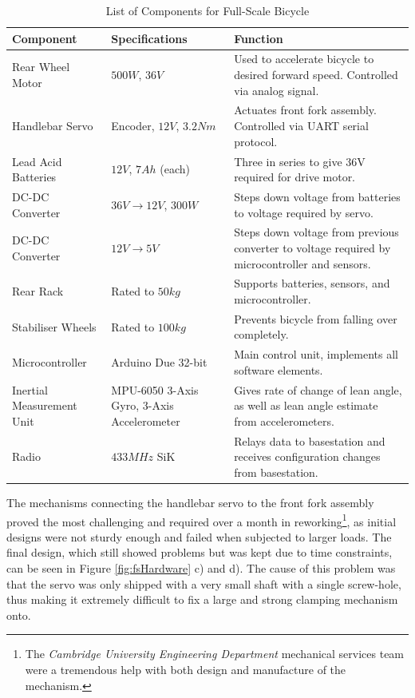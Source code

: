 \vfill
\begin{table}[H]
	\centering
 	\begin{tabular}[t]{p{4cm} p{4cm} p{7cm}} 
	\toprule
	Component & Specifications & Function \\
 	\midrule
 	Rear Wheel Motor & $\si{500W}$, $\si{36V}$ & Used to accelerate bicycle to desired forward speed. Controlled via analog signal. \\ 
 	Handlebar Servo & Encoder, $\si{12V}$, $3.2\si{Nm}$ & Actuates front fork assembly. Controlled via UART serial protocol. \\
 	Lead Acid Batteries & $\si{12V}$, $\si{7Ah}$ (each) & Three in series to give 36V required for drive motor. \\
 	DC-DC Converter & $\si{36V} \rightarrow \si{12V}$, $\si{300W}$ & Steps down voltage from batteries to voltage required by servo. \\
 	DC-DC Converter & $\si{12V} \rightarrow \si{5V}$ & Steps down voltage from previous converter to voltage required by microcontroller and sensors. \\
 	Rear Rack & Rated to $\si{50kg}$ & Supports batteries, sensors, and microcontroller. \\
 	Stabiliser Wheels & Rated to $\si{100kg}$ & Prevents bicycle from falling over completely. \\
 	Microcontroller & Arduino Due 32-bit & Main control unit, implements all software elements. \\
 	Inertial Measurement Unit & MPU-6050 3-Axis Gyro, 3-Axis Accelerometer & Gives rate of change of lean angle, as well as lean angle estimate from accelerometers. \\
 	Radio & $433\si{MHz}$ SiK & Relays data to basestation and receives configuration changes from basestation. \\
 	\bottomrule
	\end{tabular}
 	\caption{List of Components for Full-Scale Bicycle}
	\label{table:fscomponents}
\end{table}
\vfill

\newpage
The mechanisms connecting the handlebar servo to the front fork assembly proved the most challenging and required over a month in reworking\footnote{The \textit{Cambridge University Engineering Department} mechanical services team were a tremendous help with both design and manufacture of the mechanism.}, as initial designs were not sturdy enough and failed when subjected to larger loads. The final design, which still showed problems but was kept due to time constraints, can be seen in Figure \ref{fig:fsHardware} c) and d). The cause of this problem was that the servo was only shipped with a very small shaft with a single screw-hole, thus making it extremely difficult to fix a large and strong clamping mechanism onto. \\

